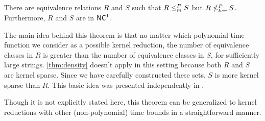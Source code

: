 \begin{theorem}\label{thm:different}
  There are equivalence relations $R$ and $S$ such that $R \leq^{P}_{m} S$ but $R \nleq^{P}_{ker} S$.
  Furthermore, $R$ and $S$ are in ${\mathsf{NC}}^1$.
\end{theorem}

The main idea behind this theorem is that no matter which polynomial time function we consider as a possible kernel reduction, the number of equivalence classes in $R$ is greater than the number of equivalence classes in $S$, for sufficiently large strings.
\autoref{thm:density} doesn't apply in this setting because both $R$ and $S$ are kernel sparse.
Since we have carefully constructed these sets, $S$ is more kernel sparse than $R$.
This basic idea was presented independently in \autocite[Lemma~2.3]{gz14}.

Though it is not explicitly stated here, this theorem can be generalized to kernel reductions with other (non-polynomial) time bounds in a straightforward manner.

